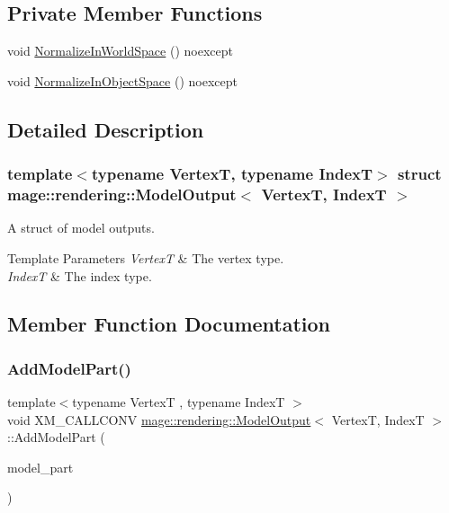 \subsection*{Private Member Functions}
\begin{DoxyCompactItemize}
\item 
void \mbox{\hyperlink{structmage_1_1rendering_1_1_model_output_aa0bdaad37789cf846a9e11bfba0f4bff}{Normalize\+In\+World\+Space}} () noexcept
\item 
void \mbox{\hyperlink{structmage_1_1rendering_1_1_model_output_af5a1604a451f2e5b993ed94b871b1e85}{Normalize\+In\+Object\+Space}} () noexcept
\end{DoxyCompactItemize}


\subsection{Detailed Description}
\subsubsection*{template$<$typename VertexT, typename IndexT$>$\newline
struct mage\+::rendering\+::\+Model\+Output$<$ Vertex\+T, Index\+T $>$}

A struct of model outputs.


\begin{DoxyTemplParams}{Template Parameters}
{\em VertexT} & The vertex type. \\
\hline
{\em IndexT} & The index type. \\
\hline
\end{DoxyTemplParams}


\subsection{Member Function Documentation}
\mbox{\label{structmage_1_1rendering_1_1_model_output_aa353983742bab0fe18c711dfd7e7502b}} 
\subsubsection{\texorpdfstring{Add\+Model\+Part()}{AddModelPart()}}
{\footnotesize\ttfamily template$<$typename VertexT , typename IndexT $>$ \\
void X\+M\+\_\+\+C\+A\+L\+L\+C\+O\+NV \mbox{\hyperlink{structmage_1_1rendering_1_1_model_output}{mage\+::rendering\+::\+Model\+Output}}$<$ VertexT, IndexT $>$\+::Add\+Model\+Part (\begin{DoxyParamCaption}\item[{\mbox{\hyperlink{structmage_1_1rendering_1_1_model_part}{Model\+Part}}}]{model\+\_\+part }\end{DoxyParamCaption})}

